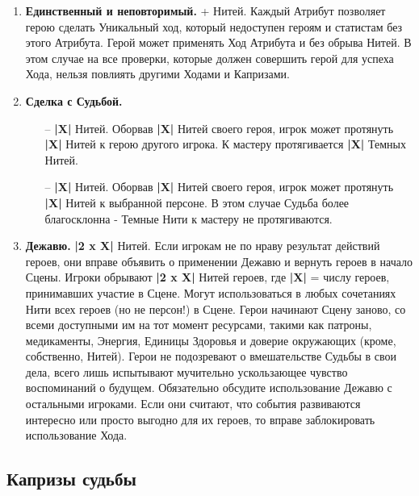 \begin{enumerate}
    \item \textbf{Единственный и неповторимый.}
    + Нитей. Каждый Атрибут позволяет герою сделать Уникальный ход, который недоступен героям и статистам без этого Атрибута.  
	Герой может применять Ход Атрибута и без обрыва Нитей. В этом случае на все проверки, которые должен совершить герой для успеха Хода, нельзя повлиять другими Ходами и Капризами.

	\item \textbf{Сделка с Судьбой.}
	\begin{itemize}
        \item[--] \textbf{|X|} Нитей. Оборвав \textbf{|X|} Нитей своего героя, игрок может протянуть \textbf{|X|} Нитей к герою другого игрока. К мастеру протягивается \textbf{|X|} Темных Нитей.
        \item[--] \textbf{|X|} Нитей. Оборвав \textbf{|X|} Нитей своего героя, игрок может протянуть \textbf{|X|} Нитей к выбранной персоне. В этом случае Судьба более благосклонна - Темные Нити к мастеру не протягиваются.
    \end{itemize}

	\item \textbf{Дежавю.}
	\newline  \textbf{|2 x X|} Нитей. Если игрокам не по нраву результат действий героев, они вправе объявить о применении Дежавю и вернуть героев в начало Сцены. 
    \newline Игроки обрывают  \textbf{|2 x X|} Нитей героев, где \textbf{|X|} = числу героев, принимавших участие в Сцене. Могут использоваться в любых сочетаниях Нити всех героев (но не персон!) в Сцене.
    \newline Герои начинают Сцену заново, со всеми доступными им на тот момент ресурсами, такими как патроны, медикаменты, Энергия, Единицы Здоровья и доверие окружающих (кроме, собственно, Нитей). Герои не подозревают о вмешательстве Судьбы в свои дела, всего лишь испытывают мучительно ускользающее чувство воспоминаний о будущем.
    \newline Обязательно обсудите использование Дежавю с остальными игроками. Если они считают, что события развиваются интересно или просто выгодно для их героев, то вправе заблокировать использование Хода. 
\end{enumerate}

\subsection{Капризы судьбы}
